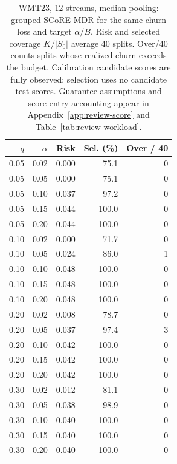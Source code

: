\begin{table}[t]
\centering\small
\begin{tabular}{rrrrr}
\toprule
$q$ & $\alpha$ & Risk & Sel. (\%) & Over / 40 \\
\midrule
0.05 & 0.02 & 0.000 & 75.1 & 0 \\
0.05 & 0.05 & 0.000 & 75.1 & 0 \\
0.05 & 0.10 & 0.037 & 97.2 & 0 \\
0.05 & 0.15 & 0.044 & 100.0 & 0 \\
0.05 & 0.20 & 0.044 & 100.0 & 0 \\
0.10 & 0.02 & 0.000 & 71.7 & 0 \\
0.10 & 0.05 & 0.024 & 86.0 & 1 \\
0.10 & 0.10 & 0.048 & 100.0 & 0 \\
0.10 & 0.15 & 0.048 & 100.0 & 0 \\
0.10 & 0.20 & 0.048 & 100.0 & 0 \\
0.20 & 0.02 & 0.008 & 78.7 & 0 \\
0.20 & 0.05 & 0.037 & 97.4 & 3 \\
0.20 & 0.10 & 0.042 & 100.0 & 0 \\
0.20 & 0.15 & 0.042 & 100.0 & 0 \\
0.20 & 0.20 & 0.042 & 100.0 & 0 \\
0.30 & 0.02 & 0.012 & 81.1 & 0 \\
0.30 & 0.05 & 0.038 & 98.9 & 0 \\
0.30 & 0.10 & 0.040 & 100.0 & 0 \\
0.30 & 0.15 & 0.040 & 100.0 & 0 \\
0.30 & 0.20 & 0.040 & 100.0 & 0 \\
\bottomrule
\end{tabular}
\caption{WMT23, 12 streams, median pooling: grouped SCoRE-MDR for the same churn loss and target $\alpha/B$. Risk and selected coverage $K/|S_0|$ average 40 splits. Over/40 counts splits whose realized churn exceeds the budget. Calibration candidate scores are fully observed; selection uses no candidate test scores. Guarantee assumptions and score-entry accounting appear in Appendix~\ref{app:review-score} and Table~\ref{tab:review-workload}.}
\label{tab:review-score-2-median}
\end{table}
